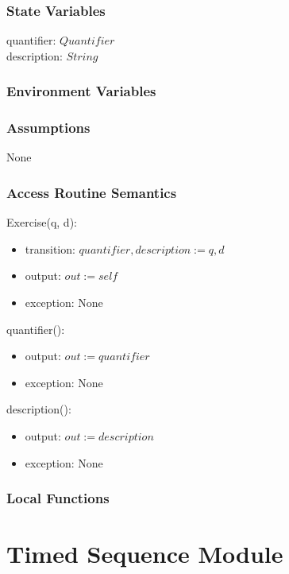 \documentclass[12pt, titlepage]{article}
\begin{document}
\subsubsection{State Variables}

quantifier: $Quantifier$ \\
description: $String$

\subsubsection{Environment Variables}

\subsubsection{Assumptions}

None

\subsubsection{Access Routine Semantics}

\noindent Exercise(q, d):
\begin{itemize}
	\item transition: $quantifier, description := q, d$
	\item output: $out := self$
	\item exception: None
\end{itemize}

\noindent quantifier():
\begin{itemize}
	\item output: $out := quantifier$
	\item exception: None
\end{itemize}

\noindent description():
\begin{itemize}
	\item output: $out := description$
	\item exception: None
\end{itemize}

\subsubsection{Local Functions}

\newpage

\section{Timed Sequence Module}
\end{document}
